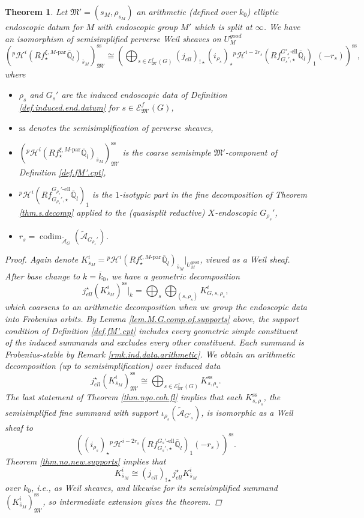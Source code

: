 \documentclass[openany]{amsbook}
\newtheorem{theorem}{Theorem}[chapter]
\theoremstyle{definition}
\theoremstyle{remark}
\numberwithin{equation}{section}
\newcommand{\Q}{\mathbb{Q}}
\newcommand{\cA}{\mathcal{A}}
\newcommand{\cE}{\mathcal{E}}
\newcommand{\ol}[1]{\overline{#1}}
\renewcommand{\-}{\operatorname{-}}
\newcommand{\on}[1]{\operatorname{#1}}
\newcommand{\pHi}{{}^p \mathcal{H}^i}
\newcommand{\pHishift}{{}^p \mathcal{H}^{i - 2r_s}}
\newcommand{\good}{\mathit{good}}
\newcommand{\el}{\text{-ell}}
\newcommand{\ctA}{\widetilde{\cA}}
\newcommand{\fM}{\mathfrak{M}}
\newcommand{\Mpar}{M\text{-par}}
\renewcommand{\ss}{\mathrm{ss}}
\newcommand{\codim}{\on{codim}}
\begin{document}
\begin{theorem}\label{thm.coh.wfl}
    Let $\fM' = (s_M, \rho_{s_M})$ an arithmetic (defined over $k_0$) elliptic endoscopic datum for $M$ with endoscopic group $M'$ which is split at $\infty$. We have an isomorphism of semisimplified perverse Weil sheaves on $U_M^{\good}$
    $$
(\pHi(Rf_\star^{\xi, \Mpar} \ol{\Q}_l)_{\ol{s}_M})^{\ss}_{\fM'} \cong \left(\bigoplus_{s \in \cE_{\fM'}^f(G)} (j_{ell})_{!\star}(i_{\rho_s})_\star \pHishift(Rf_{G_{s}',\star}^{G'_s\el} \ol{\mathbb{Q}}_l)_1(-r_s)\right)^{\ss},
    $$
    where
    \begin{itemize}
        \item $\rho_s$ and $G_s'$ are the induced endoscopic data of Definition \ref{def.induced.end.datum} for $s \in \cE_{\fM'}^f(G)$,
        \item $\ss$ denotes the semisimplification of perverse sheaves,
        \item $(\pHi(Rf_\star^{\xi, \Mpar} \ol{\Q}_l)_{\ol{s}_M})^{\ss}_{\fM'}$ is the coarse semisimple $\fM'$-component of Definition \ref{def.fM'.cpt},
        \item $\pHi(R f_{G_{\rho_s}',\star}^{G_{\rho_s}'\el} \ol{\Q}_l)_1$ is the $1$-isotypic part in the fine decomposition of Theorem \ref{thm.s.decomp} applied to the (quasisplit reductive) $X$-endoscopic $G_{\rho_s}'$,
    \item $r_s = \codim_{\ctA_G}(\ctA_{G_{\rho_s}'})$.
    \end{itemize}
\begin{proof}
    Again denote $K_{\ol{s}_M}^i = \pHi(Rf_\star^{\xi, \Mpar} \ol{\Q}_l)_{\ol{s}_M}|_{U^{\good}_M}$, viewed as a Weil sheaf. After base change to $k = \ol{k}_0$, we have a geometric decomposition $$
        j_{ell}^\star (K^i_{\ol{s}_M})^{\ss}|_k = \bigoplus_{s} \bigoplus_{(s, \rho_s)} K^i_{G, s, \rho_s},
    $$
    which coarsens to an arithmetic decomposition when we group the endoscopic data into Frobenius orbits. By Lemma \ref{lem.M.G.comp.of.supports} above, the support condition of Definition \ref{def.fM'.cpt} includes every geometric simple constituent of the induced summands and excludes every other constituent. Each summand is Frobenius-stable by Remark \ref{rmk.ind.data.arithmetic}. We obtain an arithmetic decomposition (up to semisimplification) over induced data
    $$
        j_{ell}^\star (K_{\ol{s}_M}^i)^{\ss}_{\fM'} \cong \bigoplus_{s \in \cE_{\fM'}^f(G)} K_{s, \rho_s}^{\ss}.
    $$
    The last statement of Theorem \ref{thm.ngo.coh.fl} implies that each $K_{s, \rho_s}^{\ss}$, the semisimplified fine summand with support $\iota_{\rho_s}(\ctA_{G'_s})$, is isomorphic as a Weil sheaf to $$\left((i_{\rho_s})_\star \pHishift(Rf_{G_s',\star}^{G_s'\el} \ol{\Q}_l)_1(-r_s)\right)^{\ss}.$$ Theorem \ref{thm.no.new.supports} implies that
    $$
        K^i_{\ol{s}_M} \cong (j_{ell})_{!\star} j_{ell}^\star K^i_{\ol{s}_M}
    $$
    over $k_0$, i.e., as Weil sheaves, and likewise for its semisimplified summand $(K^i_{\ol{s}_M})^{\ss}_{\fM'}$, so intermediate extension gives the theorem.
\end{proof}
\end{theorem}
\end{document}
